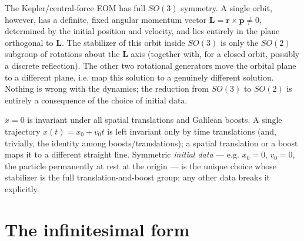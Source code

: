 \begin{example}
The Kepler/central-force EOM has full $SO(3)$ symmetry.
     A single
    orbit, however, has a definite, fixed angular momentum vector $\bm L = \bm
    r\times\bm p\neq 0$, determined by the initial position and velocity, and
    lies entirely in the plane orthogonal to $\bm L$. The stabilizer of this
    orbit inside $SO(3)$ is only the $SO(2)$ subgroup of rotations about the
    $\bm L$ axis (together with, for a closed orbit, possibly a discrete
    reflection). The other two rotational generators move the orbital plane to
    a different plane, i.e. map this solution to a genuinely different
    solution. Nothing is wrong with the dynamics; the reduction from $SO(3)$ to
    $SO(2)$ is entirely a consequence of the choice of initial data.
\end{example}

\begin{example}
$\ddot x=0$ is invariant under all spatial translations and Galilean boosts. A
    single trajectory $x(t)=x_0+v_0t$ is left invariant only by time
    translations (and, trivially, the identity among boosts/translations); a
    spatial translation or a boost maps it to a different straight line.
    Symmetric \emph{initial data} — e.g. $x_0=0,\,v_0=0$, the particle
    permanently at rest at the origin — is the unique choice whose stabilizer
    is the full translation-and-boost group; any other data breaks it
    explicitly.
\end{example}




\section{The infinitesimal form}
\label{sec:infinitesimal}

